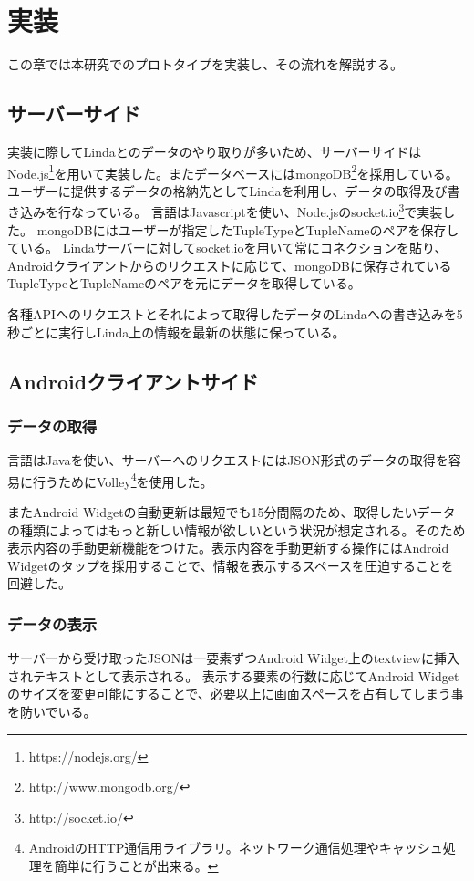 \chapter{実装}
\label{chap:prototype}

この章では本研究でのプロトタイプを実装し、その流れを解説する。

\section{サーバーサイド}
実装に際してLindaとのデータのやり取りが多いため、サーバーサイドはNode.js\footnote{https://nodejs.org/}を用いて実装した。またデータベースにはmongoDB\footnote{http://www.mongodb.org/}を採用している。ユーザーに提供するデータの格納先としてLindaを利用し、データの取得及び書き込みを行なっている。
言語はJavascriptを使い、Node.jsのsocket.io\footnote{http://socket.io/}で実装した。
mongoDBにはユーザーが指定したTupleTypeとTupleNameのペアを保存している。
Lindaサーバーに対してsocket.ioを用いて常にコネクションを貼り、Androidクライアントからのリクエストに応じて、mongoDBに保存されているTupleTypeとTupleNameのペアを元にデータを取得している。

各種APIへのリクエストとそれによって取得したデータのLindaへの書き込みを5秒ごとに実行しLinda上の情報を最新の状態に保っている。

\section{Androidクライアントサイド}
\subsection{データの取得}
言語はJavaを使い、サーバーへのリクエストにはJSON形式のデータの取得を容易に行うためにVolley\footnote{AndroidのHTTP通信用ライブラリ。ネットワーク通信処理やキャッシュ処理を簡単に行うことが出来る。}を使用した。

またAndroid Widgetの自動更新は最短でも15分間隔のため、取得したいデータの種類によってはもっと新しい情報が欲しいという状況が想定される。そのため表示内容の手動更新機能をつけた。表示内容を手動更新する操作にはAndroid Widgetのタップを採用することで、情報を表示するスペースを圧迫することを回避した。

\subsection{データの表示}
サーバーから受け取ったJSONは一要素ずつAndroid Widget上のtextviewに挿入されテキストとして表示される。
表示する要素の行数に応じてAndroid Widgetのサイズを変更可能にすることで、必要以上に画面スペースを占有してしまう事を防いでいる。

